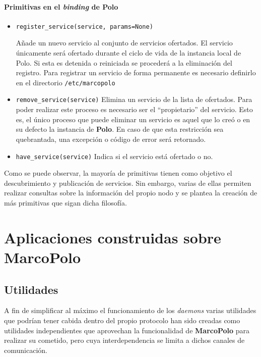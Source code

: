 \paragraph{Primitivas en el \textit{binding} de Polo}

\begin{itemize}
\item \texttt{register\_service(service, params=None)}

Añade un nuevo servicio al conjunto de servicios ofertados. El servicio únicamente será ofertado durante el ciclo de vida de la instancia local de Polo. Si esta es detenida o reiniciada se procederá a la eliminación del registro. Para registrar un servicio de forma permanente es necesario definirlo en el directorio \texttt{/etc/marcopolo} %

\item \texttt{remove\_service(service)}
Elimina un servicio de la lista de ofertados. Para poder realizar este proceso es necesario ser el ``propietario'' del servicio. Esto es, el único proceso que puede eliminar un servicio es aquel que lo creó o en su defecto la instancia de \textbf{Polo}. En caso de que esta restricción sea quebrantada, una excepción o código de error será retornado.

\item \texttt{have\_service(service)}
Indica si el servicio está ofertado o no.

\end{itemize}

Como se puede observar, la mayoría de primitivas tienen como objetivo el descubrimiento y publicación de servicios. Sin embargo, varias de ellas permiten realizar consultas sobre la información del propio nodo y se plantea la creación de más primitivas que sigan dicha filosofía.

\section{Aplicaciones construidas sobre MarcoPolo}
 
\subsection{Utilidades}

A fin de simplificar al máximo el funcionamiento de los \textit{daemons} varias utilidades que podrían tener cabida dentro del propio protocolo han sido creadas como utilidades independientes que aprovechan la funcionalidad de \textbf{MarcoPolo} para realizar su cometido, pero cuya interdependencia se limita a dichos canales de comunicación.

